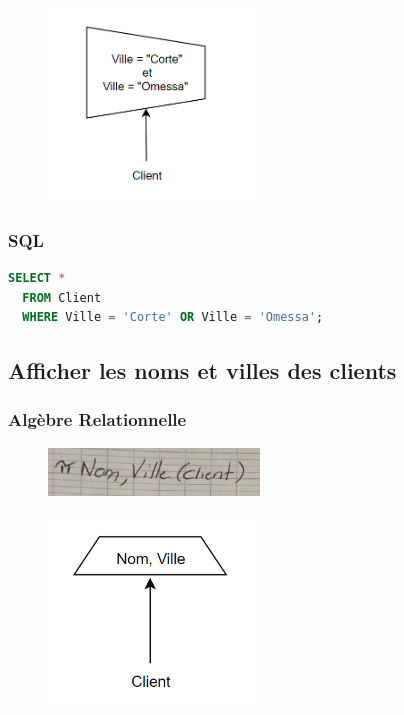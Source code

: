 \documentclass{article}
\begin{document}
\begin{figure}[H]
  \centering
  \includegraphics[width=0.5\textwidth]{algRel/1.png}
  \label{fig:alg-rel}
\end{figure}

\subsubsection{SQL}

\begin{lstlisting}[language=SQL]
  SELECT * 
  FROM Client 
  WHERE Ville = 'Corte' OR Ville = 'Omessa';  
\end{lstlisting}

\subsection{Afficher les noms et villes des clients}

\subsubsection{Algèbre Relationnelle}

\begin{figure}[H]
  \centering
  \includegraphics[width=0.5\textwidth]{alg/2.png}
  \label{fig:alg-rel}
\end{figure}

\begin{figure}[H]
  \centering
  \includegraphics[width=0.5\textwidth]{algRel/2.png}
  \label{fig:alg-rel}
\end{figure}
\end{document}
